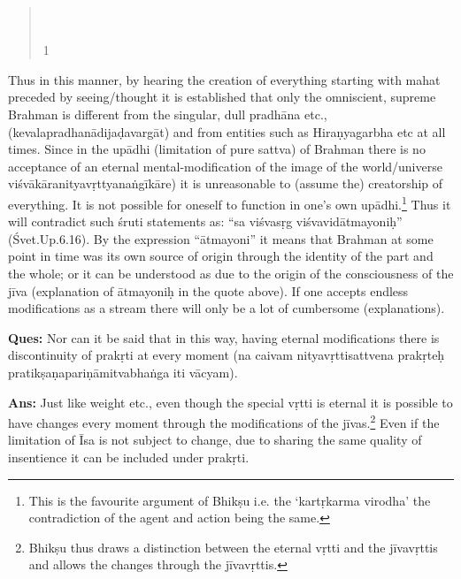 \begin{verse}
\\
\\
 1 \\
\end{verse}

Thus in this manner, by hearing the creation of everything starting with mahat preceded by seeing/thought it is established that only the omniscient, supreme Brahman is different from the singular, dull pradhāna etc., (kevalapradhanādijaḍavargāt) and from entities such as Hiraṇyagarbha etc at all times. Since in the upādhi (limitation of pure sattva) of Brahman there is no acceptance of an eternal mental-modification of the image of the world/universe viśvākāranityavṛttyanaṅgīkāre) it is unreasonable to (assume the) creatorship of everything. It is not possible for oneself to function in one’s own upādhi.\footnote{This is the favourite argument of Bhikṣu i.e. the ‘kartṛkarma virodha’ the contradiction of the agent and action being the same.} Thus it will contradict such śruti statements as: “sa viśvasṛg viśvavidātmayoniḥ” (Śvet.Up.6.16). By the expression “ātmayoni” it means that Brahman at some point in time was its own source of origin through the identity of the part and the whole; or it can be understood as due to the origin of the consciousness of the jīva (explanation of ātmayoniḥ in the quote above). If one accepts endless modifications as a stream there will only be a lot of cumbersome (explanations).

\textbf{Ques:} Nor can it be said that in this way, having eternal modifications there is discontinuity of prakṛti at every moment (na caivam nityavṛttisattvena prakṛteḥ pratikṣaṇapariṇāmitvabhaṅga iti vācyam). 

\textbf{Ans:} Just like weight etc., even though the special vṛtti is eternal it is possible to have changes every moment through the modifications of the jīvas.\footnote{Bhikṣu thus draws a distinction between the eternal vṛtti and the jīvavṛttis and allows the changes through the jīvavṛttis.} Even if the limitation of Īsa is not subject to change, due to sharing the same quality of insentience it can be included under prakṛti. 

